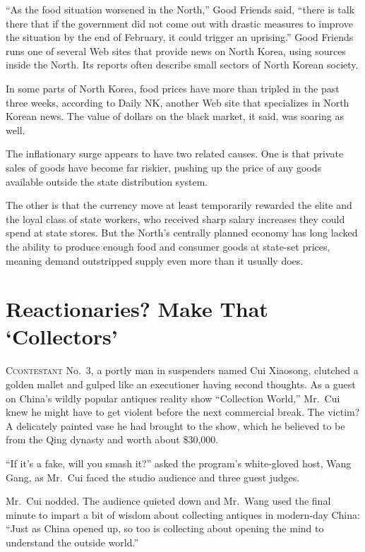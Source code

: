 ﻿\documentclass[12pt]{article}
\begin{document}
``As the food situation worsened in the North,'' Good Friends said, ``there is talk there that if
the government did not come out with drastic measures to improve the situation by the end of
February, it could trigger an uprising.'' Good Friends runs one of several Web sites that provide
news on North Korea, using sources inside the North. Its reports often describe small sectors of
North Korean society.

In some parts of North Korea, food prices have more than tripled in the past three weeks, according
to Daily NK, another Web site that specializes in North Korean news. The value of dollars on the
black market, it said, was soaring as well.

The inflationary surge appears to have two related causes. One is that private sales of goods have
become far riskier, pushing up the price of any goods available outside the state distribution
system.

The other is that the currency move at least temporarily rewarded the elite and the loyal class of
state workers, who received sharp salary increases they could spend at state stores. But the North's
centrally planned economy has long lacked the ability to produce enough food and consumer goods at
state-set prices, meaning demand outstripped supply even more than it usually does.

\section{Reactionaries? Make That `Collectors'}

\lettrine{C}{contestant} No.~3, a portly man in suspenders named Cui
Xiaosong, clutched a golden mallet and gulped like an executioner having second thoughts. As a guest
on China's wildly popular antiques reality show ``Collection World,'' Mr.~Cui knew he might have to
get violent before the next commercial break. The victim? A delicately painted vase he had brought
to the show, which he believed to be from the Qing dynasty and worth about \$30,000.


``If it's a fake, will you smash it?'' asked the program's white-gloved host, Wang Gang, as Mr.~Cui
faced the studio audience and three guest judges.

Mr.~Cui nodded. The audience quieted down and Mr.~Wang used the final minute to impart a bit of
wisdom about collecting antiques in modern-day China: ``Just as China opened up, so too is
collecting about opening the mind to understand the outside world.''
\end{document}
